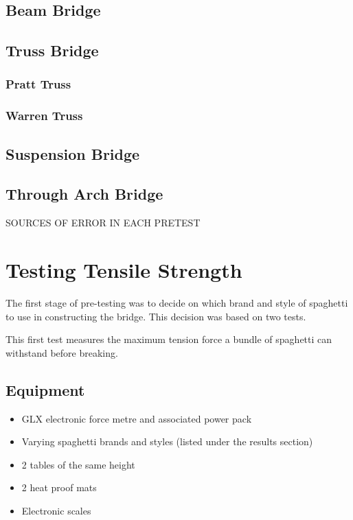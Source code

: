 \documentclass[a4paper,11pt]{article}
\begin{document}
\subsection{Beam Bridge}

\subsection{Truss Bridge}

\subsubsection{Pratt Truss}

\subsubsection{Warren Truss}

\subsection{Suspension Bridge}

\subsection{Through Arch Bridge}


SOURCES OF ERROR IN EACH PRETEST




\section{Testing Tensile Strength}

The first stage of pre-testing was to decide on which brand and style of
spaghetti to use in constructing the bridge.
This decision was based on two tests.

This first test measures the maximum tension force a bundle of spaghetti can
withstand before breaking.


\subsection{Equipment}

\begin{itemize}
\item GLX electronic force metre and associated power pack
\item Varying spaghetti brands and styles (listed under the results section)
\item 2 tables of the same height
\item 2 heat proof mats
\item Electronic scales
\end{itemize}
\end{document}
